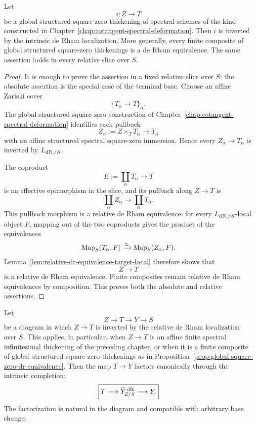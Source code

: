 \begin{proposition}
\label{prop:global-square-zero-dr-equivalence}
Let
\[
    i:Z\longrightarrow T
\]
be a global structured square-zero thickening of spectral schemes of the kind constructed in
Chapter~\ref{chap:cotangent-spectral-deformation}.  Then \(i\) is inverted by the intrinsic de Rham
localization.  More generally, every finite composite of global structured square-zero thickenings is
a de Rham equivalence.  The same assertion holds in every relative slice over \(S\).
\end{proposition}

\begin{proof}
It is enough to prove the assertion in a fixed relative slice over \(S\); the absolute assertion is
the special case of the terminal base.  Choose an affine Zariski cover
\[
    \{T_\alpha\longrightarrow T\}_\alpha.
\]
The global structured square-zero construction of
Chapter~\ref{chap:cotangent-spectral-deformation} identifies each pullback
\[
    Z_\alpha:=Z\times_TT_\alpha\longrightarrow T_\alpha
\]
with an affine structured spectral square-zero immersion.  Hence every
\(Z_\alpha\to T_\alpha\) is inverted by \(L_{\mathrm{dR},/S}\).

The coproduct
\[
    E:=\coprod_\alpha T_\alpha\longrightarrow T
\]
is an effective epimorphism in the slice, and its pullback along \(Z\to T\) is
\[
    \coprod_\alpha Z_\alpha
    \longrightarrow
    \coprod_\alpha T_\alpha.
\]
This pullback morphism is a relative de Rham equivalence: for every
\(L_{\mathrm{dR},/S}\)-local object \(F\), mapping out of the two coproducts gives the product of the
equivalences
\[
    \operatorname{Map}_S(T_\alpha,F)
    \xrightarrow{\simeq}
    \operatorname{Map}_S(Z_\alpha,F).
\]
Lemma~\ref{lem:relative-dr-equivalence-target-local} therefore shows that
\[
    Z\longrightarrow T
\]
is a relative de Rham equivalence.  Finite composites remain relative de Rham equivalences by
composition.  This proves both the absolute and relative assertions.
\end{proof}

\begin{proposition}
\label{prop:finite-infinitesimal-factorization-completion}
Let
\[
    Z\longrightarrow T\longrightarrow Y\longrightarrow S
\]
be a diagram in which \(Z\to T\) is inverted by the relative de Rham localization over \(S\).
This applies, in particular, when \(Z\to T\) is an affine finite spectral infinitesimal thickening of
the preceding chapter, or when it is a finite composite of global structured square-zero thickenings
as in Proposition~\ref{prop:global-square-zero-dr-equivalence}.  Then the map \(T\to Y\) factors
canonically through the intrinsic completion:
\[
\boxed{
    T\longrightarrow
    \widehat Y^{\,\mathrm{dR}}_{Z/S}
    \longrightarrow
    Y.
}
\]
The factorization is natural in the diagram and compatible with arbitrary base change.
\end{proposition}

